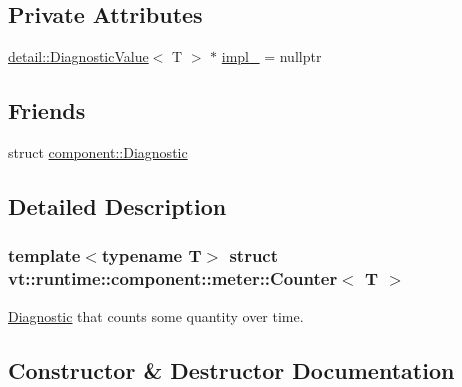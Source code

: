 \subsection*{Private Attributes}
\begin{DoxyCompactItemize}
\item 
\hyperlink{structvt_1_1runtime_1_1component_1_1detail_1_1_diagnostic_value}{detail\+::\+Diagnostic\+Value}$<$ T $>$ $\ast$ \hyperlink{structvt_1_1runtime_1_1component_1_1meter_1_1_counter_a2e2b0b2a78c95c3017a571bd76310eba}{impl\+\_\+} = nullptr
\end{DoxyCompactItemize}
\subsection*{Friends}
\begin{DoxyCompactItemize}
\item 
struct \hyperlink{structvt_1_1runtime_1_1component_1_1meter_1_1_counter_a48f263de9dbf26c1fc7736031cca9613}{component\+::\+Diagnostic}
\end{DoxyCompactItemize}


\subsection{Detailed Description}
\subsubsection*{template$<$typename T$>$\newline
struct vt\+::runtime\+::component\+::meter\+::\+Counter$<$ T $>$}

\hyperlink{structvt_1_1runtime_1_1component_1_1_diagnostic}{Diagnostic} that counts some quantity over time. 

\subsection{Constructor \& Destructor Documentation}
\mbox{\label{structvt_1_1runtime_1_1component_1_1meter_1_1_counter_afbe8191f66fc515812ee5bf1b5d857a8}} 
